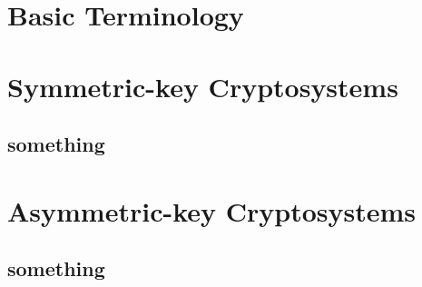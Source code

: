 \documentclass{report}
\begin{document}
	\section{Basic Terminology}
	
	\section{Symmetric-key Cryptosystems}

	\subsection{something}

	\section{Asymmetric-key Cryptosystems}

	\subsection{something}
\end{document}
